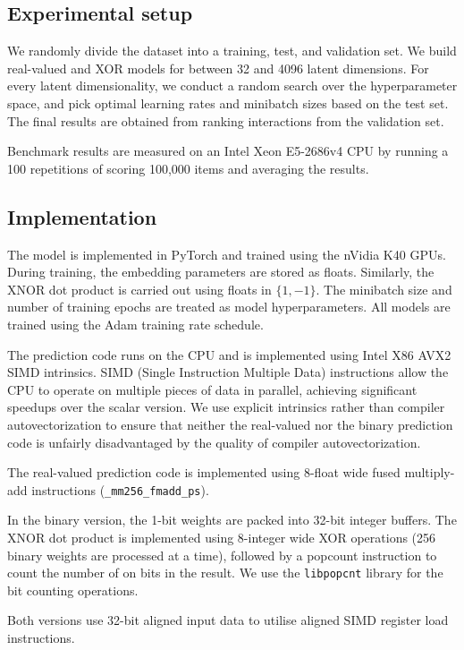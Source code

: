 \documentclass[sigconf]{acmart}
\begin{document}
\subsection{Experimental setup}
We randomly divide the dataset into a training, test, and validation set. We build real-valued and XOR models for between 32 and 4096 latent dimensions. For every latent dimensionality, we conduct a random search over the hyperparameter space, and pick optimal learning rates and minibatch sizes based on the test set. The final results are obtained from ranking interactions from the validation set.

Benchmark results are measured on an Intel Xeon E5-2686v4 CPU by running a 100 repetitions of scoring 100,000 items and averaging the results.

\subsection{Implementation}
The model is implemented in PyTorch and trained using the nVidia K40 GPUs. During training, the embedding parameters are stored as floats. Similarly, the XNOR dot product is carried out using floats in $\{1, -1\}$. The minibatch size and number of training epochs are treated as model hyperparameters. All models are trained using the Adam training rate schedule. 

The prediction code runs on the CPU and is implemented using Intel X86 AVX2 SIMD intrinsics. SIMD (Single Instruction Multiple Data) instructions allow the CPU to operate on multiple pieces of data in parallel, achieving significant speedups over the scalar version. We use explicit intrinsics rather than compiler autovectorization to ensure that neither the real-valued nor the binary prediction code is unfairly disadvantaged by the quality of compiler autovectorization. 

The real-valued prediction code is implemented using 8-float wide fused multiply-add instructions (\texttt{\_mm256\_fmadd\_ps}).

In the binary version, the 1-bit weights are packed into 32-bit integer buffers. The XNOR dot product is implemented using 8-integer wide XOR operations (256 binary weights are processed at a time), followed by a popcount instruction to count the number of on bits in the result. We use the \texttt{libpopcnt} \citep{mula2016faster} library for the bit counting operations.

Both versions use 32-bit aligned input data to utilise aligned SIMD register load instructions. 
\end{document}
